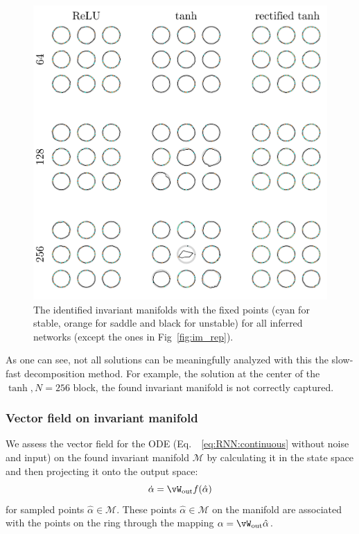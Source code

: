 \documentclass{article} %
\newcounter{ct}
\newcommand{\wout}{\vW_{\text{out}}}
\newcommand{\manifold}{\mathcal{M}}
\theoremstyle{definition}
\theoremstyle{remark}
\begin{document}
\newpage
  \begin{figure}[tbhp]
     \centering
    \includegraphics[width=\textwidth]{im_all_3x3}
       \caption{The identified invariant manifolds with the fixed points (cyan for stable, orange for saddle and black for unstable) for all inferred networks (except the ones in Fig~\ref{fig:im_rep}).}\label{fig:im_all}
\end{figure}

As one can see, not all solutions can be meaningfully analyzed with this the slow-fast decomposition method. For example, the solution at the center of the \(\tanh, N=256\) block, the found invariant manifold is not correctly captured.





\newpage
 \subsubsection{Vector field on invariant manifold}\label{sec:supp:vf}

 We assess the vector field for the ODE (Eq.~~\ref{eq:RNN:continuous} without noise and input) on the found invariant manifold \(\manifold\) by calculating it in the state space
 and then projecting it onto the output space:
 \begin{equation}
\dot \alpha =  \wout f(\hat \alpha) %
\end{equation}
for sampled points \(\hat \alpha\in \manifold\).
These points \(\hat \alpha\in \manifold\) on the manifold are associated with the points on the ring through the mapping \(\alpha = \wout\hat\alpha\).
\end{document}
